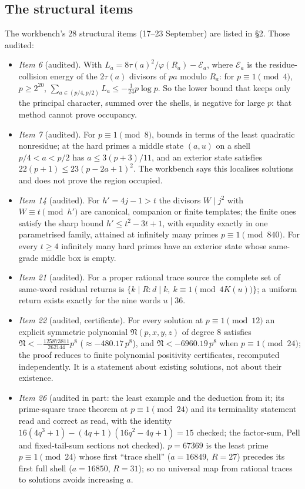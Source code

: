 \subsection{The structural items}

The workbench's 28 structural items (17--23 September) are listed in  §2. Those audited:
\begin{itemize}
\item \emph{Item 6} (audited). With $L_a=8\tau(a)^2/\varphi(R_a)-\mathcal E_a$, where $\mathcal E_a$ is the residue-collision energy of the $2\tau(a)$ divisors of $pa$ modulo $R_a$: for $p\equiv1\pmod4$, $p\ge2^{20}$, $\sum_{a\in(p/4,p/2)}L_a\le-\tfrac1{24}p\log p$. So the lower bound that keeps only the principal character, summed over the shells, is negative for large $p$: that method cannot prove occupancy.
\item \emph{Item 7} (audited). For $p\equiv1\pmod 8$, bounds in terms of the least quadratic nonresidue; at the hard primes a middle state $(a,u)$ on a shell $p/4<a<p/2$ has $a\le3(p+3)/11$, and an exterior state satisfies $22(p+1)\le23(p-2a+1)^2$. The workbench says this localises solutions and does not prove the region occupied.
\item \emph{Item 14} (audited). For $h'=4j-1>t$ the divisors $W\mid j^2$ with $W\equiv t\pmod{h'}$ are canonical, companion or finite templates; the finite ones satisfy the sharp bound $h'\le t^2-3t+1$, with equality exactly in one parametrised family, attained at infinitely many primes $p\equiv1\pmod{840}$. For every $t\ge4$ infinitely many hard primes have an exterior state whose same-grade middle box is empty.
\item \emph{Item 21} (audited). For a proper rational trace source the complete set of same-word residual returns is $\{k\mid R: d\mid k,\ k\equiv1\pmod{4K(u)}\}$; a uniform return exists exactly for the nine words $u\mid36$.
\item \emph{Item 22} (audited, certificate). For every solution at $p\equiv1\pmod{12}$ an explicit symmetric polynomial $\mathfrak N(p,x,y,z)$ of degree $8$ satisfies $\mathfrak N<-\frac{125873811}{262144}p^8$ ($\approx-480.17\,p^8$), and $\mathfrak N<-6960.19\,p^8$ when $p\equiv1\pmod{24}$; the proof reduces to finite polynomial positivity certificates, recomputed independently. It is a statement about existing solutions, not about their existence.
\item \emph{Item 26} (audited in part: the least example and the deduction from it; its prime-square trace theorem at $p\equiv1\pmod{24}$ and its terminality statement read and correct as read, with the identity $16(4q^3+1)-(4q+1)(16q^2-4q+1)=15$ checked; the factor-sum, Pell and fixed-tail-sum sections not checked). $p=67369$ is the least prime $p\equiv1\pmod{24}$ whose first ``trace shell'' ($a=16849$, $R=27$) precedes its first full shell ($a=16850$, $R=31$); so no universal map from rational traces to solutions avoids increasing $a$.

\end{itemize}
